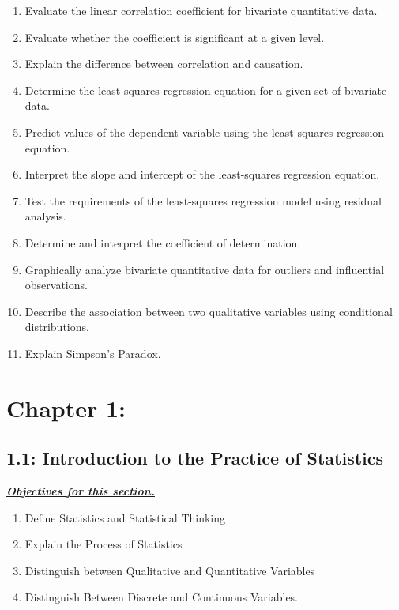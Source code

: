 \documentclass{report}
\begin{document}
    \begin{enumerate}
        \item Evaluate the linear correlation coefficient for bivariate quantitative data.
        \item Evaluate whether the coefficient is significant at a given level.
        \item Explain the difference between correlation and causation.
        \item Determine the least-squares regression equation for a given set of bivariate data.
        \item Predict values of the dependent variable using the least-squares regression equation.
        \item Interpret the slope and intercept of the least-squares regression equation.
        \item Test the requirements of the least-squares regression model using residual analysis.
        \item Determine and interpret the coefficient of determination.
        \item Graphically analyze bivariate quantitative data for outliers and influential observations.
        \item Describe the association between two qualitative variables using conditional distributions.
        \item Explain Simpson’s Paradox.
    \end{enumerate}

    \pagebreak \bigbreak \noindent
    \section{Chapter 1:}

    \bigbreak \noindent 
    \subsection{1.1: Introduction to the Practice of Statistics}

    \bigbreak \noindent 
    \textbf{\textit{\underline{Objectives for this section.}}}
    \begin{enumerate}
        \item Define Statistics and Statistical Thinking
        \item Explain the Process of Statistics
        \item Distinguish between Qualitative and Quantitative Variables
        \item Distinguish Between Discrete and Continuous Variables.
    \end{enumerate}
    
\end{document}
